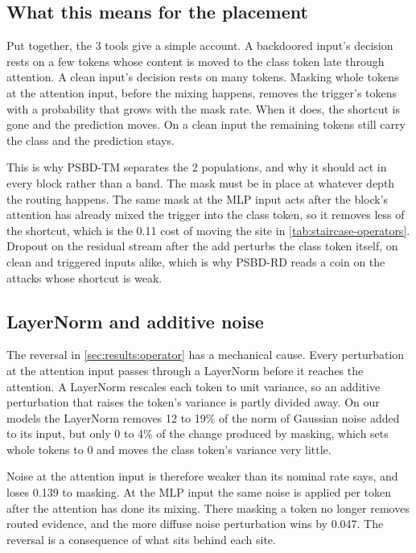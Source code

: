 \subsection{What this means for the placement}
\label{sec:mechanism:placements}

Put together, the 3 tools give a simple account. A backdoored input's decision rests on a few tokens whose content is moved to the class token late through attention. A clean input's decision rests on many tokens. Masking whole tokens at the attention input, before the mixing happens, removes the trigger's tokens with a probability that grows with the mask rate. When it does, the shortcut is gone and the prediction moves. On a clean input the remaining tokens still carry the class and the prediction stays.

This is why PSBD-TM separates the 2 populations, and why it should act in every block rather than a band. The mask must be in place at whatever depth the routing happens. The same mask at the MLP input acts after the block's attention has already mixed the trigger into the class token, so it removes less of the shortcut, which is the 0.11 cost of moving the site in \cref{tab:staircase-operators}. Dropout on the residual stream after the add perturbs the class token itself, on clean and triggered inputs alike, which is why PSBD-RD reads a coin on the attacks whose shortcut is weak.

\subsection{LayerNorm and additive noise}
\label{sec:mechanism:layernorm}

The reversal in \cref{sec:results:operator} has a mechanical cause. Every perturbation at the attention input passes through a LayerNorm before it reaches the attention. A LayerNorm rescales each token to unit variance, so an additive perturbation that raises the token's variance is partly divided away. On our models the LayerNorm removes 12 to 19\% of the norm of Gaussian noise added to its input, but only 0 to 4\% of the change produced by masking, which sets whole tokens to 0 and moves the class token's variance very little.

Noise at the attention input is therefore weaker than its nominal rate says, and loses 0.139 to masking. At the MLP input the same noise is applied per token after the attention has done its mixing. There masking a token no longer removes routed evidence, and the more diffuse noise perturbation wins by 0.047. The reversal is a consequence of what sits behind each site.


